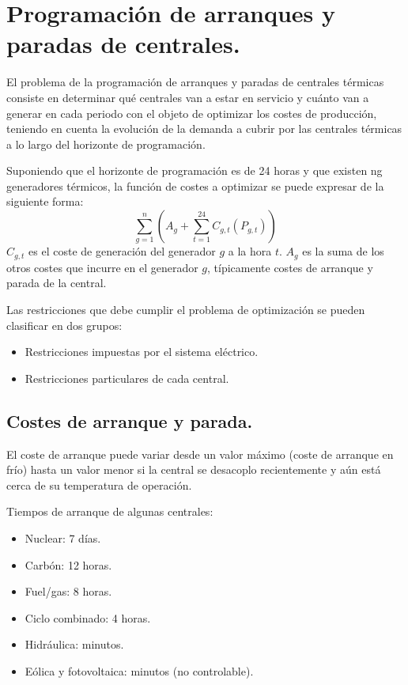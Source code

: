 	\section{Programación de arranques y paradas de centrales.}
		El problema de la programación de arranques y paradas de centrales térmicas
		consiste en determinar qué centrales van a estar en servicio y cuánto van a generar en
		cada periodo con el objeto de optimizar los costes de producción, teniendo en cuenta
		la evolución de la demanda a cubrir por las centrales térmicas a lo largo del
		horizonte de programación.
		
		
		Suponiendo que el horizonte de programación es de 24 horas y que existen ng
		generadores térmicos, la función de costes a optimizar se puede expresar de la
		siguiente forma:
		\[\sum_{g=1}^{n}\left(A_g + \sum_{t=1}^{24} C_{g,t}(P_{g,t})\right)\]
		$C_{g,t}$ es el coste de generación del generador $g$ a la hora $t$.
		$A_g$ es la suma de los otros costes que incurre en el generador $g$, típicamente costes de arranque y parada de la central.
		
		
		Las restricciones que debe cumplir el problema de optimización se pueden clasificar
		en dos grupos:
		\begin{itemize}
			\item Restricciones impuestas por el sistema eléctrico.
			\item Restricciones particulares de cada central.
		\end{itemize}
		
		\subsection{Costes de arranque y parada.}
			El coste de arranque puede variar desde un valor máximo (coste de arranque en frío) hasta un valor
			menor si la central se desacoplo recientemente y aún está cerca de su temperatura de operación.

			Tiempos de arranque de algunas centrales:
			\begin{itemize}
				\item Nuclear: 7 días.
				\item Carbón: 12 horas.
				\item Fuel/gas: 8 horas.
				\item Ciclo combinado: 4 horas.
				\item Hidráulica: minutos.
				\item Eólica y fotovoltaica: minutos (no controlable).
			\end{itemize}
			
